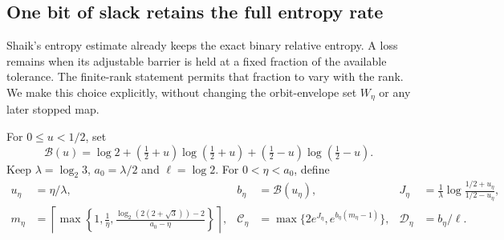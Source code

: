 \documentclass[11pt]{article}
\theoremstyle{remark}\newtheorem{remark}[proposition]{Remark}
\begin{document}
\subsection{One bit of slack retains the full entropy rate}

Shaik's entropy estimate already keeps the exact binary relative entropy.
A loss remains when its adjustable barrier is held at a fixed fraction
of the available tolerance. The finite-rank statement permits that
fraction to vary with the rank. We make this choice explicitly, without
changing the orbit-envelope set \(W_\eta\) or any later stopped map.

For \(0\le u<1/2\), set
\[
 \mathcal B(u)=\log2+
  (\tfrac12+u)\log(\tfrac12+u)+(\tfrac12-u)\log(\tfrac12-u).
\]
Keep \(\lambda=\log_2 3\), \(a_0=\lambda/2\) and \(\ell=\log2\).
For \(0<\eta<a_0\), define
\begin{align}
 u_\eta&=\eta/\lambda,& b_\eta&=\mathcal B(u_\eta),&
 J_\eta&=\frac1\lambda\log\frac{1/2+u_\eta}{1/2-u_\eta},
 \label{eq:shaik-full-entropy-constants}\\
 m_\eta&=\left\lceil\max\left\{
  1,\frac1\eta,\frac{\log_2(2(2+\sqrt3))-2}{a_0-\eta}
                         \right\}\right\rceil,&
 \mathcal C_\eta&=\max\{2e^{J_\eta},e^{b_\eta(m_\eta-1)}\},&
 \mathcal D_\eta&=b_\eta/\ell. \nonumber
\end{align}
\end{document}
